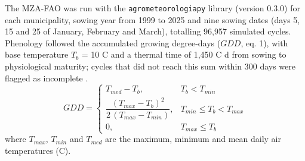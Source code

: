 \documentclass[10pt,a4paper]{article}
\begin{document}
The MZA-FAO was run with the \texttt{agrometeorologiapy} library (version 0.3.0) for each municipality,
sowing year from 1999 to 2025 and nine sowing dates (days 5, 15 and 25 of January, February and March),
totalling 96,957 simulated cycles. Phenology followed the accumulated growing degree-days ($GDD$, eq. 1),
with base temperature $T_b$ = 10 \textdegree{}C and a thermal time of 1,450 \textdegree{}C d from sowing to
physiological maturity; cycles that did not reach this sum within 300 days were flagged as incomplete
\citep{pereira2002}.
\begin{equation}
GDD =
\begin{cases}
T_{med} - T_b, & T_b < T_{min}\\[2pt]
\dfrac{(T_{max} - T_b)^2}{2\,(T_{max} - T_{min})}, & T_{min} \le T_b < T_{max}\\[6pt]
0, & T_{max} \le T_b
\end{cases}
\label{eq:gdd}
\end{equation}
where $T_{max}$, $T_{min}$ and $T_{med}$ are the maximum, minimum and mean daily air temperatures
(\textdegree{}C).
\end{document}
